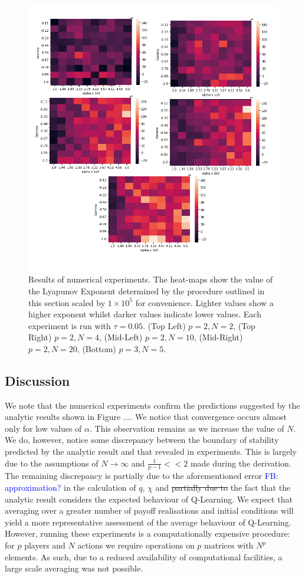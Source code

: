 \documentclass[sigconf]{aamas}
\newcommand\fb[1]{\textcolor{blue}{FB: #1}}
\begin{document}
\begin{figure}[t]
    \centering
    \includegraphics[width = 0.9 \linewidth]{Figures/Experiments.png}
    \caption{Results of numerical experiments. The heat-maps show the value of the Lyapunov Exponent determined by the procedure outlined in this section scaled by $1 \times 10^5$ for convenience. Lighter values show a higher exponent whilst darker values indicate lower values. Each experiment is run with $\tau = 0.05$. (Top Left) $p = 2, N = 2$, (Top Right) $p = 2, N = 4$, (Mid-Left) $p = 2, N = 10$, (Mid-Right) $p = 2, N = 20$, (Bottom) $p = 3, N = 5$.}
    \label{fig:NumericalExperiments}
\end{figure}

\subsection{Discussion}

We note that the numerical experiments confirm the predictions suggested by the analytic results shown in Figure .... We notice that convergence occurs almost only for low values of $\alpha$. This observation remains as we increase the value of $N$. We do, however, notice some discrepancy between the boundary of stability predicted by the analytic result and that revealed in experiments. This is largely due to the assumptions of $N \rightarrow \infty$ and $\frac{1}{p-1} << 2$ made during the derivation. The remaining discrepancy is partially due to the aforementioned error \fb{approximation?} in the calculation of $q$, $\chi$ and \st{partially due to} the fact that the analytic result considers the expected behaviour of Q-Learning. We expect that averaging over a greater number of payoff realisations and initial conditions will yield a more representative assessment of the average behaviour of Q-Learning. However, running these experiments is a computationally expensive procedure: for $p$ players and $N$ actions we require operations on $p$ matrices with $N^{p}$ elements. As such, due to a reduced availability of computational facilities, a large scale averaging was not possible.
\end{document}

